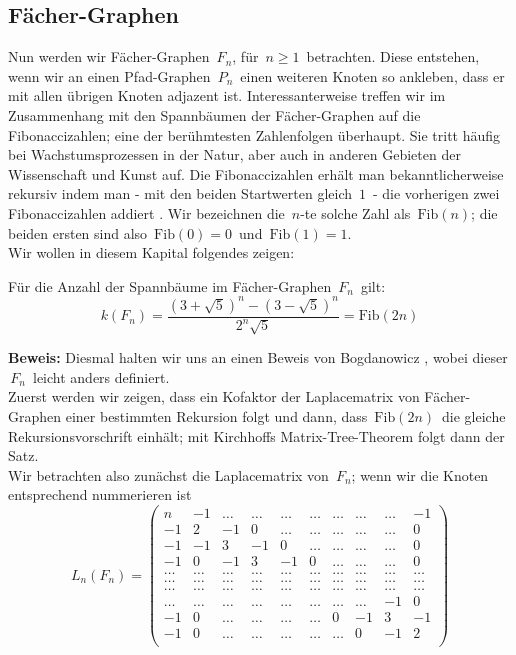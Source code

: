 \subsection{Fächer-Graphen}
Nun werden wir Fächer-Graphen $\,F_n$,\; für $\,n \geq 1\,$ betrachten. Diese entstehen, wenn wir an einen Pfad-Graphen $\,P_{n}\,$ einen weiteren Knoten so ankleben, dass er mit allen übrigen Knoten adjazent ist. Interessanterweise treffen wir im Zusammenhang mit den Spannbäumen der Fächer-Graphen auf die  Fibonaccizahlen; eine der berühmtesten Zahlenfolgen überhaupt. Sie tritt häufig bei Wachstumsprozessen in der Natur, aber auch in anderen Gebieten der Wissenschaft und Kunst auf. Die Fibonaccizahlen erhält man bekanntlicherweise rekursiv indem man - mit den  beiden Startwerten gleich $\,1\,$ - die vorherigen zwei Fibonaccizahlen addiert \cite{a45}. Wir bezeichnen die $\,n$-te solche Zahl als $\,\mathrm{Fib}(n)$;\; die beiden ersten sind also $\,\mathrm{Fib}(0)=0\,$ und $\,\mathrm{Fib}(1)=1$.\;\\
Wir wollen in diesem Kapital folgendes zeigen:
\begin{Tms}
 Für die Anzahl der Spannbäume im Fächer-Graphen $\,F_n\,$ gilt:
 \begin{equation*}
  \mathit{k}(F_n)=\frac{(3+\sqrt{5})^{n}-(3-\sqrt{5})^{n}}{2^{n}\sqrt{5}}=\mathrm{Fib}(2n)
 \end{equation*}
 \label{ThmFn}
\end{Tms}
\textbf{Beweis:}
Diesmal halten wir uns an einen Beweis von Bogdanowicz \cite{bogdanowicz_2008}, wobei dieser $\,F_n\,$ leicht anders definiert.\\
Zuerst werden wir zeigen, dass ein Kofaktor der Laplacematrix von Fächer-Graphen einer bestimmten Rekursion folgt und dann, dass $\,\mathrm{Fib}(2n)\,$ die gleiche Rekursionsvorschrift einhält; mit Kirchhoffs Matrix-Tree-Theorem folgt dann der Satz.\\
Wir betrachten also zunächst die Laplacematrix von $\,F_n$; wenn wir die Knoten entsprechend nummerieren ist\\
\begin{equation*}
L_n(F_n)=
\begin{pmatrix}
n&-1&\ldots&\ldots&\ldots&\ldots&\ldots&\ldots&\ldots&-1\\
-1&2&-1&0&\ldots&\ldots&\ldots&\ldots&\ldots&0\\
-1&-1&3&-1&0&\ldots&\ldots&\ldots&\ldots&0\\
-1&0&-1&3&-1&0&\ldots&\ldots&\ldots&0\\
\ldots&\ldots&\ldots&\ldots&\ldots&\ldots&\ldots&\ldots&\ldots&\ldots\\
\ldots&\ldots&\ldots&\ldots&\ldots&\ldots&\ldots&\ldots&\ldots&\ldots\\
\ldots&\ldots&\ldots&\ldots&\ldots&\ldots&\ldots&\ldots&\ldots&\ldots\\
\ldots&\ldots&\ldots&\ldots&\ldots&\ldots&\ldots&\ldots&-1&0\\
-1&0&\ldots&\ldots&\ldots&\ldots&0&-1&3&-1\\
-1&0&\ldots&\ldots&\ldots&\ldots&\ldots&0&-1&2\\
\end{pmatrix}
\end{equation*}
